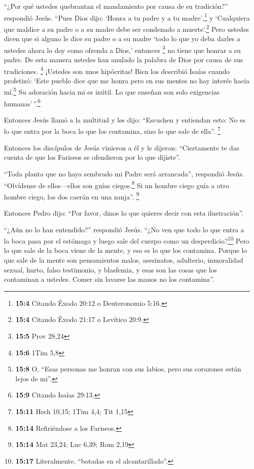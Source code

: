  ``¿Por qué ustedes quebrantan el mandamiento por causa de
su tradición?'' respondió Jesús.  ``Pues Dios dijo: `Honra
a tu padre y a tu madre',\footnote{\textbf{15:4} Citando Éxodo 20:12 o
  Deuteronomio 5:16.} y `Cualquiera que maldice a su padre o a su madre
debe ser condenado a muerte'.\footnote{\textbf{15:4} Citando Éxodo 21:17
  o Levítico 20:9.}  Pero ustedes dicen que si alguno le
dice su padre o a su madre `todo lo que yo deba darles a ustedes ahora
lo doy como ofrenda a Dios,' entonces \footnote{\textbf{15:5} Prov 28,24}
 no tiene que honrar a su padre. De esta manera ustedes
han anulado la palabra de Dios por causa de sus tradiciones. \footnote{\textbf{15:6}
  1Tim 5,8}  ¡Ustedes son unos hipócritas! Bien los
describió Isaías cuando profetizó:  `Este pueblo dice que
me honra pero en sus mentes no hay interés hacia mí.\footnote{\textbf{15:8}
  O, ``Esas personas me honran con sus labios, pero sus corazones están
  lejos de mi''.}  Su adoración hacia mi es inútil. Lo que
enseñan son solo exigencias humanas'\,''.\footnote{\textbf{15:9} Citando
  Isaías 29:13.}

 Entonces Jesús llamó a la multitud y les dijo:
``Escuchen y entiendan esto:  No es lo que entra por la
boca lo que los contamina, sino lo que sale de ella''. \footnote{\textbf{15:11}
  Hech 10,15; 1Tim 4,4; Tit 1,15}

 Entonces los discípulos de Jesús vinieron a él y le
dijeron: ``Ciertamente te das cuenta de que los Fariseos se ofendieron
por lo que dijiste''.

 ``Toda planta que no haya sembrado mi Padre será
arrancada'', respondió Jesús.  ``Olvídense de
ellos---ellos son guías ciegos.\footnote{\textbf{15:14} Refiriéndose a
  los Fariseos.} Si un hombre ciego guía a otro hombre ciego, los dos
caerán en una zanja''. \footnote{\textbf{15:14} Mat 23,24; Luc 6,39; Rom
  2,19}

 Entonces Pedro dijo: ``Por favor, dinos lo que quieres
decir con esta ilustración''.

 ``¿Aún no lo han entendido?'' respondió Jesús.
 ``¿No ven que todo lo que entra a la boca pasa por el
estómago y luego sale del cuerpo como un desperdicio?\footnote{\textbf{15:17}
  Literalmente, ``botadas en el alcantarillado''.}  Pero
lo que sale de la boca viene de la mente, y eso es lo que los contamina.
 Porque lo que sale de la mente son pensamientos malos,
asesinatos, adulterio, inmoralidad sexual, hurto, falso testimonio, y
blasfemia,  y esas son las cosas que los contaminan a
ustedes. Comer sin lavarse las manos no los contamina''.

